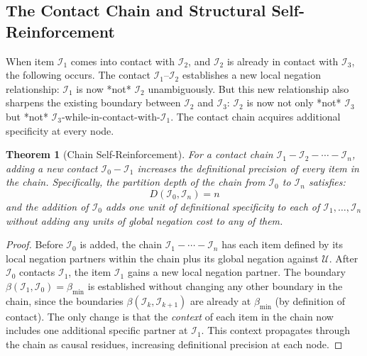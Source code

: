 \documentclass[11pt,twocolumn,a4paper]{article}
\theoremstyle{plain}
\newtheorem{theorem}{Theorem}[section]
\theoremstyle{definition}
\theoremstyle{remark}
\begin{document}
\subsection{The Contact Chain and Structural Self-Reinforcement}
\label{subsec:chain}

When item $\mathcal{I}_1$ comes into contact with $\mathcal{I}_2$, and
$\mathcal{I}_2$ is already in contact with $\mathcal{I}_3$, the following
occurs. The contact $\mathcal{I}_1$--$\mathcal{I}_2$ establishes a new local
negation relationship: $\mathcal{I}_1$ is now *not* $\mathcal{I}_2$
unambiguously. But this new relationship also sharpens the existing boundary
between $\mathcal{I}_2$ and $\mathcal{I}_3$: $\mathcal{I}_2$ is now not only
*not* $\mathcal{I}_3$ but *not* $\mathcal{I}_3$-while-in-contact-with-$\mathcal{I}_1$.
The contact chain acquires additional specificity at every node.

\begin{theorem}[Chain Self-Reinforcement]
\label{thm:chain_reinforce}
For a contact chain $\mathcal{I}_1 - \mathcal{I}_2 - \cdots - \mathcal{I}_n$,
adding a new contact $\mathcal{I}_0 - \mathcal{I}_1$ increases the definitional
precision of every item in the chain. Specifically, the partition depth of the
chain from $\mathcal{I}_0$ to $\mathcal{I}_n$ satisfies:
\begin{equation}
    D(\mathcal{I}_0, \mathcal{I}_n) = n
    \label{eq:chain_depth}
\end{equation}
and the addition of $\mathcal{I}_0$ adds one unit of definitional specificity
to each of $\mathcal{I}_1, \ldots, \mathcal{I}_n$ without adding any units of
global negation cost to any of them.
\end{theorem}

\begin{proof}
Before $\mathcal{I}_0$ is added, the chain $\mathcal{I}_1 - \cdots -
\mathcal{I}_n$ has each item defined by its local negation partners within the
chain plus its global negation against $\mathcal{U}$. After $\mathcal{I}_0$
contacts $\mathcal{I}_1$, the item $\mathcal{I}_1$ gains a new local negation
partner. The boundary $\beta(\mathcal{I}_1, \mathcal{I}_0) = \beta_{\min}$ is
established without changing any other boundary in the chain, since the
boundaries $\beta(\mathcal{I}_k, \mathcal{I}_{k+1})$ are already at $\beta_{\min}$
(by definition of contact). The only change is that the \emph{context} of each
item in the chain now includes one additional specific partner at $\mathcal{I}_1$.
This context propagates through the chain as causal residues, increasing
definitional precision at each node.
\end{proof}
\end{document}
